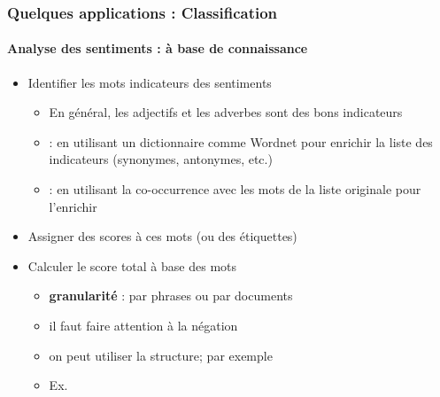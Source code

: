 \documentclass[xcolor=table]{beamer}
\begin{document}
\begin{frame}
	\frametitle{Quelques applications : Classification}
	\framesubtitle{Analyse des sentiments : à base de connaissance}
	
	\begin{itemize}
		\item Identifier les mots indicateurs des sentiments
		\begin{itemize}
			\item En général, les adjectifs et les adverbes sont des bons indicateurs
			\item {} : en utilisant un dictionnaire comme Wordnet pour enrichir la liste des indicateurs (synonymes, antonymes, etc.) 
			\item {} : en utilisant la co-occurrence avec les mots  de la liste originale pour l'enrichir 
		\end{itemize}
		\item Assigner des scores à ces mots (ou des étiquettes)
		\item Calculer le score total à  base des mots
		\begin{itemize}
			\item \textbf{granularité} : par phrases ou par documents 
			\item il faut faire attention à  la négation
			\item on peut utiliser la structure; par exemple 
			\item Ex. 
		\end{itemize}
	\end{itemize}
	
\end{frame}
\end{document}
